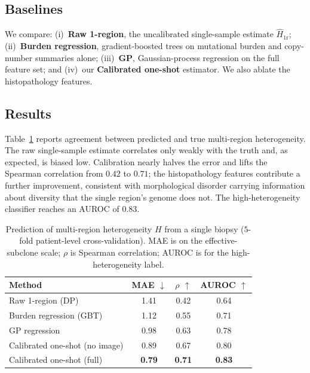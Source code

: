 \documentclass{article}
\begin{document}
\subsection{Baselines}

We compare: (i)~\textbf{Raw 1-region}, the uncalibrated single-sample estimate
$\hat H_{\text{1r}}$; (ii)~\textbf{Burden regression}, gradient-boosted trees
\citep{Friedman2001} on mutational burden and copy-number summaries alone;
(iii)~\textbf{GP}, Gaussian-process regression \citep{Rasmussen2006} on the full
feature set; and (iv)~our \textbf{Calibrated one-shot} estimator. We also ablate the
histopathology features.

\subsection{Results}

Table~\ref{tab:main} reports agreement between predicted and true multi-region
heterogeneity. The raw single-sample estimate correlates only weakly with the truth
and, as expected, is biased low. Calibration nearly halves the error and lifts the
Spearman correlation from $0.42$ to $0.71$; the histopathology features contribute a
further improvement, consistent with morphological disorder carrying information about
diversity that the single region's genome does not. The high-heterogeneity classifier
reaches an AUROC of $0.83$.

\begin{table}[t]
\caption{Prediction of multi-region heterogeneity $H$ from a single biopsy
($5$-fold patient-level cross-validation). MAE is on the effective-subclone scale;
$\rho$ is Spearman correlation; AUROC is for the high-heterogeneity label.}
\label{tab:main}
\centering
\small
\begin{tabular}{lccc}
\toprule
Method & MAE $\downarrow$ & $\rho$ $\uparrow$ & AUROC $\uparrow$ \\
\midrule
Raw 1-region (DP)              & 1.41 & 0.42 & 0.64 \\
Burden regression (GBT)        & 1.12 & 0.55 & 0.71 \\
GP regression                  & 0.98 & 0.63 & 0.78 \\
Calibrated one-shot (no image) & 0.89 & 0.67 & 0.80 \\
Calibrated one-shot (full)     & \textbf{0.79} & \textbf{0.71} & \textbf{0.83} \\
\bottomrule
\end{tabular}
\end{table}
\end{document}
